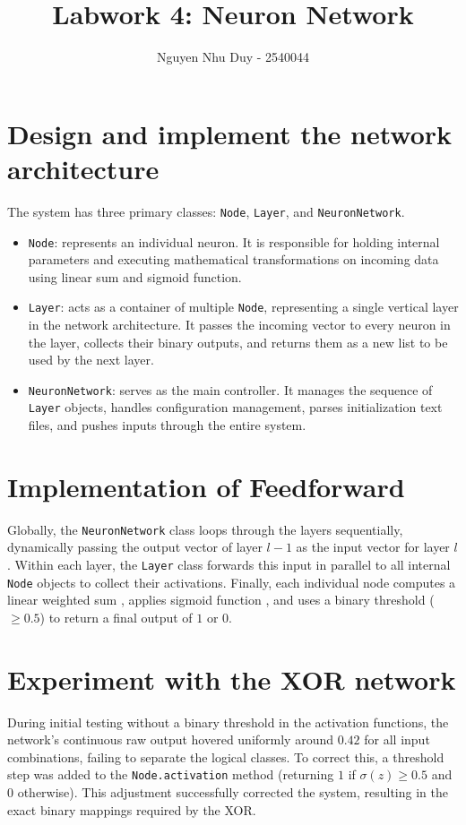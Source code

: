 \documentclass{article}
\title{Labwork 4: Neuron Network}
\author{Nguyen Nhu Duy - 2540044}
\begin{document}
\setlength{\parindent}{0pt}
\maketitle
\section{Design and implement the network architecture}
The system has three primary classes: \texttt{Node}, \texttt{Layer}, and \texttt{NeuronNetwork}.

\begin{itemize}
    \item \texttt{Node}: represents an individual neuron. It is responsible for holding internal parameters and executing mathematical transformations on incoming data using linear sum and sigmoid function.

    \item \texttt{Layer}: acts as a container of multiple \texttt{Node}, representing a single vertical layer in the network architecture. It passes the incoming vector to every neuron in the layer, collects their binary outputs, and returns them as a new list to be used by the next layer.

    \item \texttt{NeuronNetwork}: serves as the main controller. It manages the sequence of \texttt{Layer} objects, handles configuration management, parses initialization text files, and pushes inputs through the entire system. 
\end{itemize}

\section{Implementation of Feedforward}
Globally, the \texttt{NeuronNetwork} class loops through the layers sequentially, dynamically passing the output vector of layer $l-1$ as the input vector for layer $l$. Within each layer, the \texttt{Layer} class forwards this input in parallel to all internal \texttt{Node} objects to collect their activations. Finally, each individual node computes a linear weighted sum , applies  sigmoid function , and uses a binary threshold ($\geq 0.5$) to return a final output of $1$ or $0$.

\section{Experiment with the XOR network}
During initial testing without a binary threshold in the activation functions, the network's continuous raw output hovered uniformly around $0.42$ for all input combinations, failing to separate the logical classes. To correct this, a threshold step was added to the \texttt{Node.activation} method (returning $1$ if $\sigma(z) \geq 0.5$ and $0$ otherwise). This adjustment successfully corrected the system, resulting in the exact binary mappings required by the XOR.
\end{document}
